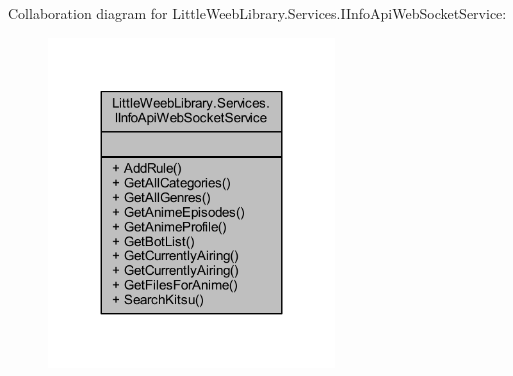 Collaboration diagram for Little\+Weeb\+Library.\+Services.\+I\+Info\+Api\+Web\+Socket\+Service\+:\nopagebreak
\begin{figure}[H]
\begin{center}
\leavevmode
\includegraphics[width=215pt]{interface_little_weeb_library_1_1_services_1_1_i_info_api_web_socket_service__coll__graph}
\end{center}
\end{figure}
